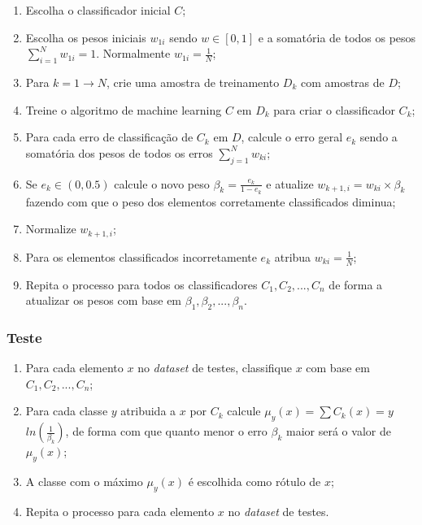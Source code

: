 \begin{enumerate}
    \item Escolha o classificador inicial \textbf{$C$};
    
    \item Escolha os pesos iniciais \textbf{$w_{1i}$} sendo $w \in [0,1]$ e a somatória de todos os pesos $\sum^{N}_{i=1} w_{1i} = 1$. Normalmente $w_{1i} = \frac{1}{N}$;
    
    \item Para $k=1 \rightarrow N$, crie uma amostra de treinamento \textbf{$D_k$} com amostras de \textbf{$D$};
    
    \item Treine o algoritmo de machine learning \textbf{$C$} em \textbf{$D_k$} para criar o classificador \textbf{$C_k$};
    
    \item Para cada erro de classificação de \textbf{$C_k$} em \textbf{$D$}, calcule o erro geral $e_k$ sendo a somatória dos pesos de todos os erros $\sum^{N}_{j=1} w_{ki}$;
    
    \item Se $e_k \in (0, 0.5)$ calcule o novo peso $\beta_k = \frac{e_k}{1-e_k}$ e atualize $w_{k+1,i} = w_{ki} \times \beta_k$ fazendo com que o peso dos elementos corretamente classificados diminua;
    
    \item Normalize $w_{k+1,i}$;
    
    \item Para os elementos classificados incorretamente $e_k$ atribua $w_{ki} = \frac{1}{N}$;
    
    \item Repita o processo para todos os classificadores \textbf{$C_1, C_2, ... , C_n$} de forma a atualizar os pesos com base em \textbf{$\beta_1, \beta_2, ... , \beta_n$}.
\end{enumerate}

\subsubsection*{Teste}

\begin{enumerate}
    \item Para cada elemento $x$ no \textit{dataset} de testes, classifique $x$ com base em \textbf{$C_1, C_2, ... , C_n$};
    
    \item Para cada classe $y$ atribuida a $x$ por $C_k$ calcule $\mu_y(x) = \sum C_k(x)=y$ $ln(\frac{1}{\beta_k})$, de forma com que quanto menor o erro $\beta_k$ maior será o valor de $\mu_y(x)$;
    
    \item A classe com o máximo $\mu_y(x)$ é escolhida como rótulo de $x$;
    
    \item Repita o processo para cada elemento $x$ no \textit{dataset} de testes.
\end{enumerate}

